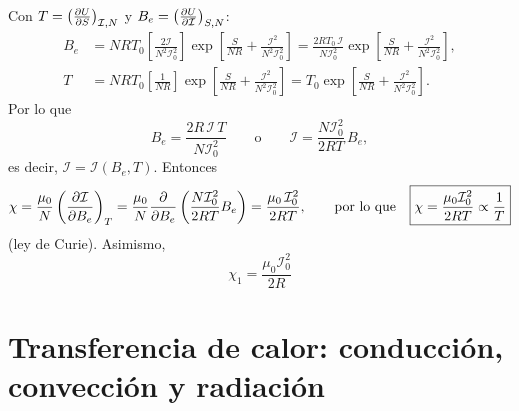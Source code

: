 \begin{solucion}
  Con $T=\left(\frac{\partial U}{\partial S}\right)_{\mathcal{I},N}$ y $B_e=\left(\frac{\partial U}{\partial \mathcal{I}}\right)_{S,N}$:
  \begin{align*}
    B_e&=NRT_0\left[\frac{2\mathcal{I}}{N^{2}\mathcal{I}_0^{2}}\right]\exp\left[\frac{S}{NR}+\frac{\mathcal{I}^{2}}{N^{2}\mathcal{I}_0^{2}}\right]
      =\frac{2RT_0\,\mathcal{I}}{N\mathcal{I}_0^{2}}\exp\left[\frac{S}{NR}+\frac{\mathcal{I}^{2}}{N^{2}\mathcal{I}_0^{2}}\right],\\
    T&=NRT_0\left[\frac{1}{NR}\right]\exp\left[\frac{S}{NR}+\frac{\mathcal{I}^{2}}{N^{2}\mathcal{I}_0^{2}}\right]
      =T_0\exp\left[\frac{S}{NR}+\frac{\mathcal{I}^{2}}{N^{2}\mathcal{I}_0^{2}}\right].
  \end{align*}
  Por lo que
  \begin{equation*}
    B_e=\frac{2R\,\mathcal{I}\,T}{N\mathcal{I}_0^{2}}
    \qquad\text{o}\qquad
    \mathcal{I}=\frac{N\mathcal{I}_0^{2}}{2RT}\,B_e,
  \end{equation*}
  es decir, $\mathcal{I}=\mathcal{I}(B_e,T)$. Entonces
  \begin{equation*}
    \chi=\frac{\mu_0}{N}\left(\frac{\partial \mathcal{I}}{\partial B_e}\right)_{T}=\frac{\mu_0}{N}\pdv{B_e}\left(\frac{N\mathcal{I}_0^{2}}{2RT}B_e\right)
    =\frac{\mu_0\,\mathcal{I}_0^{2}}{2RT},
    \qquad\text{por lo que}\quad\boxed{\chi=\frac{\mu_0\mathcal{I}_0^{2}}{2RT}\propto\frac{1}{T}}
  \end{equation*}
  (ley de Curie). Asimismo,
  \begin{equation*}
    \boxed{\chi_1=\frac{\mu_0\mathcal{I}_0^{2}}{2R}}
  \end{equation*}
\end{solucion}

\section{Transferencia de calor: conducción, convección y radiación}


